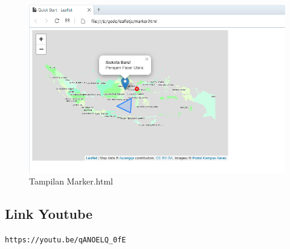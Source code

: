 \begin{enumerate}
\begin{figure}[H]
		\includegraphics[width=12cm]{figures/Tugas5/1174087/5.png}
		\centering
		\caption{Tampilan Marker.html}
	\end{figure}
\end{enumerate}
\subsection{Link Youtube}
\verb|https://youtu.be/qANOELQ_0fE|